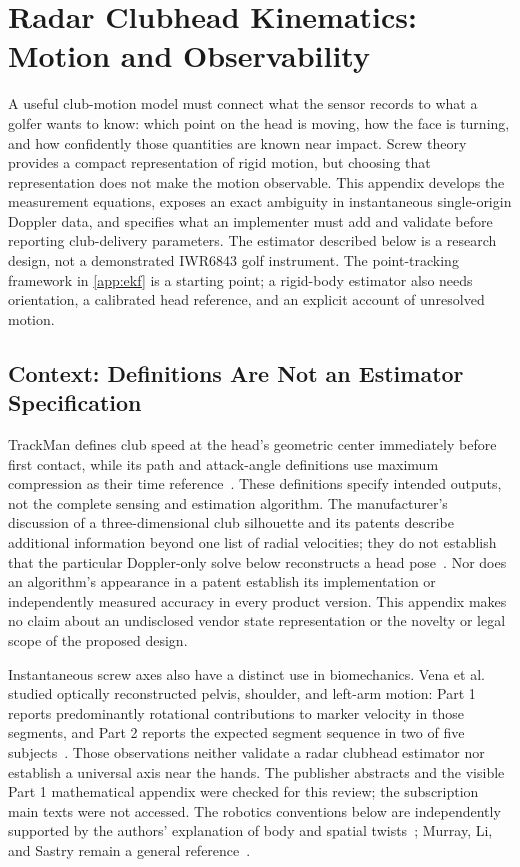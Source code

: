 \chapter{Radar Clubhead Kinematics: Motion and Observability}
\label{app:screw}
\nocite{chenmicrodoppler}

A useful club-motion model must connect what the sensor records to what a golfer wants to know: which point on the head is moving, how the face is turning, and how confidently those quantities are known near impact.
Screw theory provides a compact representation of rigid motion, but choosing that representation does not make the motion observable.
This appendix develops the measurement equations, exposes an exact ambiguity in instantaneous single-origin Doppler data, and specifies what an implementer must add and validate before reporting club-delivery parameters.
The estimator described below is a research design, not a demonstrated IWR6843 golf instrument.
The point-tracking framework in \cref{app:ekf} is a starting point; a rigid-body estimator also needs orientation, a calibrated head reference, and an explicit account of unresolved motion.

\section{Context: Definitions Are Not an Estimator Specification}
\label{sec:screw-context}

TrackMan defines club speed at the head's geometric center immediately before first contact, while its path and attack-angle definitions use maximum compression as their time reference~\cite{trackmanclubspeed,trackman40params}.
These definitions specify intended outputs, not the complete sensing and estimation algorithm.
The manufacturer's discussion of a three-dimensional club silhouette and its patents describe additional information beyond one list of radial velocities; they do not establish that the particular Doppler-only solve below reconstructs a head pose~\cite{trackmanclubdata,us10850179}.
Nor does an algorithm's appearance in a patent establish its implementation or independently measured accuracy in every product version.
This appendix makes no claim about an undisclosed vendor state representation or the novelty or legal scope of the proposed design.

Instantaneous screw axes also have a distinct use in biomechanics.
Vena et al. studied optically reconstructed pelvis, shoulder, and left-arm motion: Part 1 reports predominantly rotational contributions to marker velocity in those segments, and Part 2 reports the expected segment sequence in two of five subjects~\cite{vena2010a,vena2010b}.
Those observations neither validate a radar clubhead estimator nor establish a universal axis near the hands.
The publisher abstracts and the visible Part 1 mathematical appendix were checked for this review; the subscription main texts were not accessed.
The robotics conventions below are independently supported by the authors' explanation of body and spatial twists~\cite{modernroboticstwists}; Murray, Li, and Sastry remain a general reference~\cite{murrayliss}.

